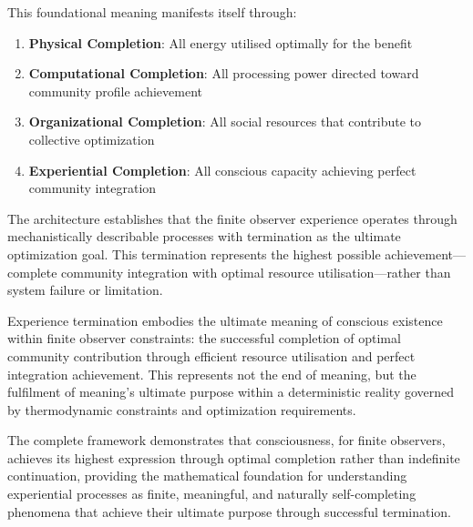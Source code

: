 \documentclass{article}
\begin{document}
This foundational meaning manifests itself through:

\begin{enumerate}
\item \textbf{Physical Completion}: All energy utilised optimally for the benefit
\item \textbf{Computational Completion}: All processing power directed toward community profile achievement  
\item \textbf{Organizational Completion}: All social resources that contribute to collective optimization
\item \textbf{Experiential Completion}: All conscious capacity achieving perfect community integration
\end{enumerate}

The architecture establishes that the finite observer experience operates through mechanistically describable processes with termination as the ultimate optimization goal. This termination represents the highest possible achievement—complete community integration with optimal resource utilisation—rather than system failure or limitation.

Experience termination embodies the ultimate meaning of conscious existence within finite observer constraints: the successful completion of optimal community contribution through efficient resource utilisation and perfect integration achievement. This represents not the end of meaning, but the fulfilment of meaning's ultimate purpose within a deterministic reality governed by thermodynamic constraints and optimization requirements.

The complete framework demonstrates that consciousness, for finite observers, achieves its highest expression through optimal completion rather than indefinite continuation, providing the mathematical foundation for understanding experiential processes as finite, meaningful, and naturally self-completing phenomena that achieve their ultimate purpose through successful termination.
\end{document}
